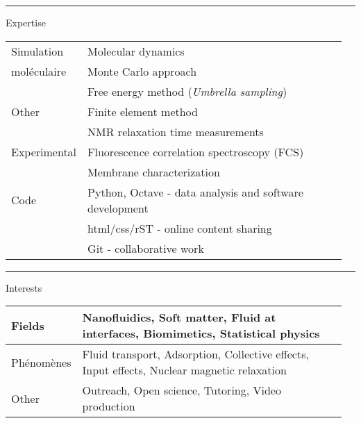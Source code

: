 \documentclass[a4paper,11pt]{concours}
\begin{document}
\newpage

\vspace{0.5cm}

\noindent\begin{minipage}{0.135\linewidth}
{\color{gray120}\rule{\textwidth}{0.22cm}\relax}
\end{minipage}
\begin{minipage}{0.82\linewidth}
{\textcolor{gray120}{\huge Expertise}}
\end{minipage}

\begin{table}[htbp]
\begin{tabular}{@{} p{0.12\linewidth} p{0.84\linewidth} @{}}
Simulation & Molecular dynamics \\
moléculaire      & Monte Carlo approach \\ 
      & Free energy method (\textit{Umbrella sampling}) \\
\hline \hline
Other     & Finite element method \\
      & NMR relaxation time measurements \\
\hline \hline
Experimental & Fluorescence correlation spectroscopy (FCS) \\
     & Membrane characterization \\
\hline \hline
Code &  Python, Octave - data analysis and software development \\
   & html/css/rST - online content sharing \\
   & Git - collaborative work \\
\end{tabular}
\end{table}

\vspace{0.5cm}

\noindent\begin{minipage}{0.135\linewidth}
{\color{gray120}\rule{\textwidth}{0.22cm}\relax}
\end{minipage}
\begin{minipage}{0.82\linewidth}
{\textcolor{gray120}{\huge Interests}}
\end{minipage}

\begin{table}[htbp]
\begin{tabular}{@{} p{0.12\linewidth} p{0.84\linewidth} @{}}
      Fields & Nanofluidics, Soft matter, Fluid at interfaces, Biomimetics, Statistical physics \\
\hline \hline
Phénomènes & Fluid transport, Adsorption, Collective effects, Input effects, Nuclear magnetic relaxation \\ 
\hline \hline
Other & Outreach, Open science, Tutoring, Video production \\
\end{tabular}
\end{table}
\end{document}
